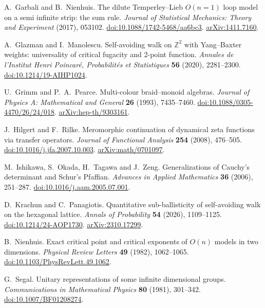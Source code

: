 A.~Garbali and B.~Nienhuis.
The dilute Temperley--Lieb $O(n=1)$ loop model on a semi infinite strip:
the sum rule.
\emph{Journal of Statistical Mechanics: Theory and Experiment} (2017), 053102.
\href{https://doi.org/10.1088/1742-5468/aa6bc3}{doi:10.1088/1742-5468/aa6bc3}.
\href{https://arxiv.org/abs/1411.7160}{arXiv:1411.7160}.

A.~Glazman and I.~Manolescu.
Self-avoiding walk on $\mathbb Z^2$ with Yang--Baxter weights:
universality of critical fugacity and 2-point function.
\emph{Annales de l'Institut Henri Poincar\'e, Probabilit\'es et Statistiques}
\textbf{56} (2020), 2281--2300.
\href{https://doi.org/10.1214/19-AIHP1024}{doi:10.1214/19-AIHP1024}.

U.~Grimm and P.~A.~Pearce.
Multi-colour braid--monoid algebras.
\emph{Journal of Physics A: Mathematical and General} \textbf{26} (1993), 7435--7460.
\href{https://doi.org/10.1088/0305-4470/26/24/018}{doi:10.1088/0305-4470/26/24/018}.
\href{https://arxiv.org/abs/hep-th/9303161}{arXiv:hep-th/9303161}.

J.~Hilgert and F.~Rilke.
Meromorphic continuation of dynamical zeta functions via transfer operators.
\emph{Journal of Functional Analysis} \textbf{254} (2008), 476--505.
\href{https://doi.org/10.1016/j.jfa.2007.10.003}{doi:10.1016/j.jfa.2007.10.003}.
\href{https://arxiv.org/abs/math/0701097}{arXiv:math/0701097}.

M.~Ishikawa, S.~Okada, H.~Tagawa and J.~Zeng.
Generalizations of Cauchy's determinant and Schur's Pfaffian.
\emph{Advances in Applied Mathematics} \textbf{36} (2006), 251--287.
\href{https://doi.org/10.1016/j.aam.2005.07.001}{doi:10.1016/j.aam.2005.07.001}.

D.~Krachun and C.~Panagiotis.
Quantitative sub-ballisticity of self-avoiding walk on the hexagonal lattice.
\emph{Annals of Probability} \textbf{54} (2026), 1109--1125.
\href{https://doi.org/10.1214/24-AOP1730}{doi:10.1214/24-AOP1730}.
\href{https://arxiv.org/abs/2310.17299}{arXiv:2310.17299}.

B.~Nienhuis.
Exact critical point and critical exponents of $O(n)$ models in two dimensions.
\emph{Physical Review Letters} \textbf{49} (1982), 1062--1065.
\href{https://doi.org/10.1103/PhysRevLett.49.1062}{doi:10.1103/PhysRevLett.49.1062}.

G.~Segal.
Unitary representations of some infinite dimensional groups.
\emph{Communications in Mathematical Physics} \textbf{80} (1981), 301--342.
\href{https://doi.org/10.1007/BF01208274}{doi:10.1007/BF01208274}.

